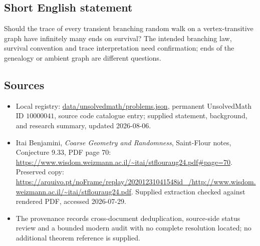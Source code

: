 \documentclass[11pt]{article}
\begin{document}
\subsection{Short English statement}
Should the trace of every transient branching random walk on a vertex-transitive graph have infinitely many ends on survival? The intended branching law, survival convention and trace interpretation need confirmation; ends of the genealogy or ambient graph are different questions.
\subsection{Sources}
\begin{itemize}
\item Local registry: \url{data/unsolvedmath/problems.json}, permanent UnsolvedMath ID \(10000041\), source code catalogue entry; supplied statement, background, and research summary, updated 2026-08-06.
\item Itai Benjamini, \emph{Coarse Geometry and Randomness}, Saint-Flour notes, Conjecture 9.33, PDF page 70: \url{https://www.wisdom.weizmann.ac.il/~itai/stflouraug24.pdf#page=70}. Preserved copy: \url{https://arquivo.pt/noFrame/replay/20201231041548id_/http://www.wisdom.weizmann.ac.il/~itai/stflouraug24.pdf}. Supplied extraction checked against rendered PDF, accessed 2026-07-29.
\item The provenance records cross-document deduplication, source-side status review and a bounded modern audit with no complete resolution located; no additional theorem reference is supplied.
\end{itemize}
\end{document}
